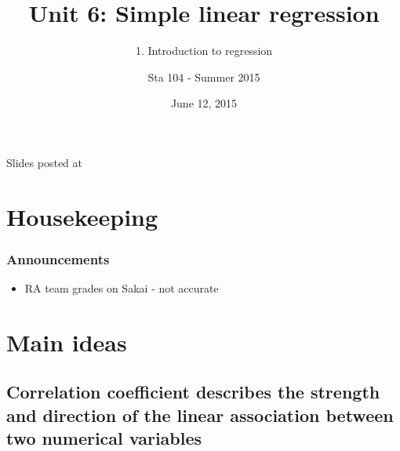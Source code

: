 \documentclass[11pt,containsverbatim,handout,xcolor=xelatex,dvipsnames,table]{beamer}
\title{Unit 6: Simple linear regression}
\subtitle{1. Introduction to regression}
\author{Sta 104 - Summer 2015}
\date{June 12, 2015}
\institute{Duke University, Department of Statistical Science}
\begin{document}



\begin{frame}[plain]

\titlepage
\vfill
{\scriptsize {} \hfill Slides posted at  \webLink{\CourseSite}{\CourseSite}}
\addtocounter{framenumber}{-1} 

\end{frame}


\section{Housekeeping}


\begin{frame}
\frametitle{Announcements}

\begin{itemize}

\item RA team grades on Sakai - not accurate

\end{itemize}

\end{frame}


\section{Main ideas}


\subsection{Correlation coefficient describes the strength and direction of the linear association between two numerical variables}
\label{mi1}

\end{document}
